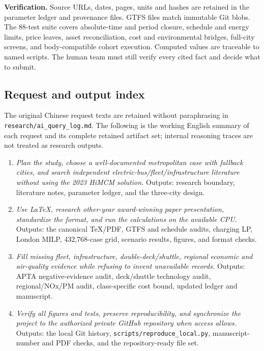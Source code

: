 \documentclass[12pt,letterpaper]{article}
\begin{document}
\textbf{Verification.} Source URLs, dates, pages, units and hashes are retained in the parameter ledger and provenance files. GTFS files match immutable Git blobs. The 88-test suite covers absolute-time and period closure, schedule and energy limits, price leaves, asset reconciliation, cost and environmental bridges, full-city screens, and body-compatible cohort execution. Computed values are traceable to named scripts. The human team must still verify every cited fact and decide what to submit.

\subsection*{Request and output index}
The original Chinese request texts are retained without paraphrasing in \nolinkurl{research/ai_query_log.md}. The following is the working English summary of each request and its complete retained artifact set; internal reasoning traces are not treated as research outputs.

\begin{enumerate}[leftmargin=*]
\item \emph{Plan the study, choose a well-documented metropolitan case with fallback cities, and search independent electric-bus/fleet/infrastructure literature without using the 2023 HiMCM solution.} Outputs: research boundary, literature notes, parameter ledger, and the three-city design.
\item \emph{Use LaTeX, research other-year award-winning paper presentation, standardize the format, and run the calculations on the available CPU.} Outputs: the canonical TeX/PDF, GTFS and schedule audits, charging LP, London MILP, 432,768-case grid, scenario results, figures, and format checks.
\item \emph{Fill missing fleet, infrastructure, double-deck/shuttle, regional economic and air-quality evidence while refusing to invent unavailable records.} Outputs: APTA negative-evidence audit, deck/shuttle technology audit, regional/NOx/PM audit, class-specific cost bound, updated ledger and manuscript.
\item \emph{Verify all figures and tests, preserve reproducibility, and synchronize the project to the authorized private GitHub repository when access allows.} Outputs: the local Git history, \nolinkurl{scripts/reproduce_local.py}, manuscript-number and PDF checks, and the repository-ready file set.
\end{enumerate}
\end{document}
